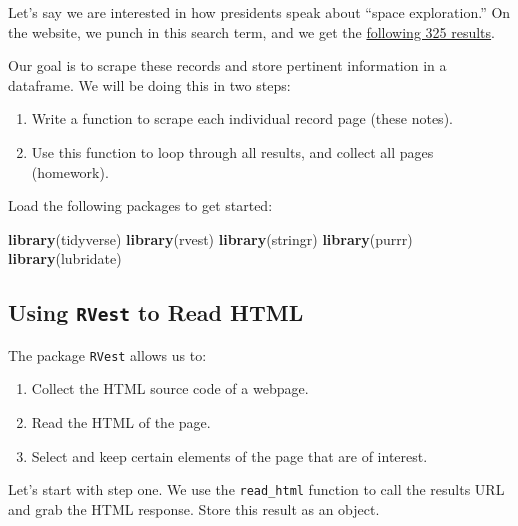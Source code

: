 \documentclass[
]{book}
\newenvironment{Shaded}{\begin{snugshade}}{\end{snugshade}}
\newcommand{\KeywordTok}[1]{\textcolor[rgb]{0.13,0.29,0.53}{\textbf{#1}}}
\newcommand{\NormalTok}[1]{#1}
\providecommand{\tightlist}{%
  \setlength{\itemsep}{0pt}\setlength{\parskip}{0pt}}
\begin{document}
Let's say we are interested in how presidents speak about ``space exploration.'' On the website, we punch in this search term, and we get the \href{https://www.presidency.ucsb.edu/advanced-search?field-keywords=\%22space+exploration\%22\&field-keywords2=\&field-keywords3=\&from\%5Bdate\%5D=\&to\%5Bdate\%5D=\&person2=\&items_per_page=100}{following 325 results}.

Our goal is to scrape these records and store pertinent information in a dataframe. We will be doing this in two steps:

\begin{enumerate}
\def\labelenumi{\arabic{enumi}.}
\tightlist
\item
  Write a function to scrape each individual record page (these notes).
\item
  Use this function to loop through all results, and collect all pages (homework).
\end{enumerate}

Load the following packages to get started:

\begin{Shaded}
\begin{Highlighting}[]
\KeywordTok{library}\NormalTok{(tidyverse)}
\KeywordTok{library}\NormalTok{(rvest)}
\KeywordTok{library}\NormalTok{(stringr)}
\KeywordTok{library}\NormalTok{(purrr)}
\KeywordTok{library}\NormalTok{(lubridate)}
\end{Highlighting}
\end{Shaded}

\hypertarget{using-rvest-to-read-html}{%
\subsection{\texorpdfstring{Using \texttt{RVest} to Read HTML}{Using RVest to Read HTML}}\label{using-rvest-to-read-html}}

The package \texttt{RVest} allows us to:

\begin{enumerate}
\def\labelenumi{\arabic{enumi}.}
\tightlist
\item
  Collect the HTML source code of a webpage.
\item
  Read the HTML of the page.
\item
  Select and keep certain elements of the page that are of interest.
\end{enumerate}

Let's start with step one. We use the \texttt{read\_html} function to call the results URL and grab the HTML response. Store this result as an object.
\end{document}
